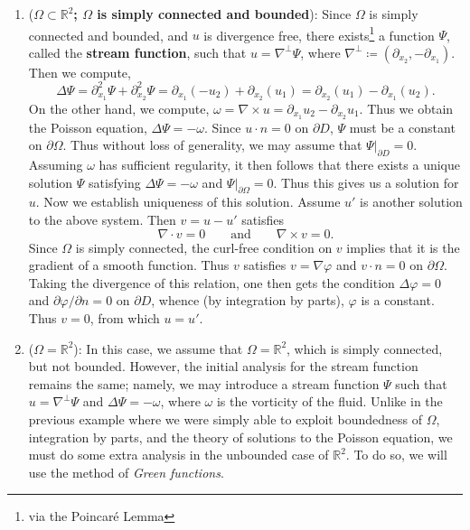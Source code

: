 \documentclass{article}
\begin{document}
\begin{enumerate}[itemsep =-2pt,label = (\arabic{*})]
	\item (\textbf{$\Omega \subset \mathbb{R}^{2}$; $\Omega$ is simply connected and bounded}): Since $\Omega$ is simply connected and bounded, and $u$ is divergence free, there exists\footnote{via the Poincar\'e Lemma} a function $\Psi$, called the \textbf{stream function}, such that $u = \nabla^{\perp}\Psi$, where $\nabla^{\perp} \coloneqq (\partial_{x_{2}}, -\partial_{x_{1}})$. Then we compute, 
	\begin{equation*}
		\Delta \Psi = \partial^{2}_{x_{1}}\Psi + \partial^{2}_{x_{2}}\Psi = \partial_{x_{1}}(-u_{2}) + \partial_{x_{2}}(u_{1}) = \partial_{x_{2}}(u_{1}) - \partial_{x_{1}}(u_{2}). 
	\end{equation*} 
	On the other hand, we compute, $\omega = \nabla \times u = \partial_{x_{1}}u_{2} - \partial_{x_{2}}u_{1}$. Thus we obtain the Poisson equation, $\Delta \Psi = -\omega$. Since $u \cdot n = 0$ on $\partial D$, $\Psi$ must be a constant on $\partial \Omega$. Thus without loss of generality, we may assume that $\Psi|_{\partial D} = 0$. Assuming $\omega$ has sufficient regularity, it then follows that there exists a unique solution $\Psi$ satisfying $\Delta \Psi = -\omega$ and $\Psi|_{\partial \Omega} = 0$. Thus this gives us a solution for $u$. Now we establish uniqueness of this solution. Assume $u'$ is another solution to the above system. Then $v = u - u'$ satisfies 
	\begin{equation*}
		\nabla \cdot v = 0 \qquad \text{and} \qquad \nabla \times v = 0. 
	\end{equation*}
	Since $\Omega$ is simply connected, the curl-free condition on $v$ implies that it is the gradient of a smooth function. Thus $v$ satisfies $v = \nabla \varphi$ and $v \cdot n = 0$ on $\partial \Omega$. Taking the divergence of this relation, one then gets the condition $\Delta \varphi = 0$ and $\partial \varphi/\partial n = 0$ on $\partial D$, whence (by integration by parts), $\varphi$ is a constant. Thus $v = 0$, from which $u = u'$. 
	
	\item (\textbf{$\Omega = \mathbb{R}^{2}$}): In this case, we assume that $\Omega = \mathbb{R}^{2}$, which is simply connected, but not bounded. However, the initial analysis for the stream function remains the same; namely, we may introduce a stream function $\Psi$ such that $u = \nabla^{\perp}\Psi$ and $\Delta \Psi = -\omega$, where $\omega$ is the vorticity of the fluid. Unlike in the previous example where we were simply able to exploit boundedness of $\Omega$, integration by parts, and the theory of solutions to the Poisson equation, we must do some extra analysis in the unbounded case of $\mathbb{R}^{2}$. To do so, we will use the method of \textit{Green functions}. 
	

\end{enumerate}
\end{document}
